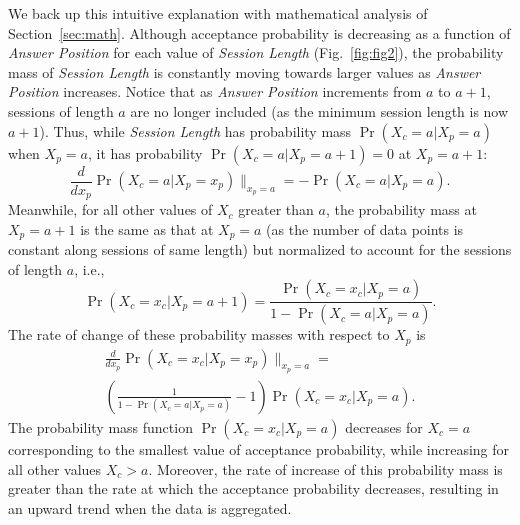 We back up this intuitive explanation with mathematical analysis of Section~\ref{sec:math}.
Although acceptance probability is decreasing as a function of \emph{Answer Position} for each value of \emph{Session Length} (Fig.~\ref{fig:fig2}), the probability mass of \emph{Session Length} is constantly moving towards larger values as \emph{Answer Position} increases. Notice that as \emph{Answer Position} increments from $a$ to $a+1$, sessions of length $a$ are no longer included (as the minimum session length is now $a+1$). Thus, while \emph{Session Length} has probability mass $\Pr(X_c=a|X_p=a)$ when $X_p=a$, it has probability $\Pr(X_c=a|X_p=a+1) = 0$ at $X_p=a+1$:
\begin{equation}
  \frac{d}{dx_p}\Pr(X_c=a|X_p=x_p)\|_{x_p=a} = -\Pr(X_c=a|X_p=a).
\end{equation}
Meanwhile, for all other values of $X_c$ greater than $a$, the probability mass at $X_p=a+1$ is the same as that at $X_p=a$ (as the number of data points is constant along sessions of same length) but normalized to account for the sessions of length $a$, i.e.,
\begin{equation}
 \Pr(X_c=x_c|X_p=a+1) = \frac{\Pr(X_c=x_c|X_p=a)}{1-\Pr(X_c=a|X_p=a)}.
\end{equation}
The rate of change of these probability masses with respect to $X_p$ is
\begin{multline}
  \frac{d}{dx_p}\Pr(X_c=x_c|X_p=x_p)\|_{x_p=a}  =   \\ \left(\frac{1}{1-\Pr(X_c=a|X_p=a)}-1\right)\Pr(X_c=x_c|X_p=a).
\end{multline}
The probability mass function $\Pr(X_c=x_c|X_p=a)$ decreases for $X_c=a$ corresponding to the smallest value of acceptance probability, while increasing for all other values $X_c > a$. Moreover, the rate of increase of this probability mass is greater than the rate at which the acceptance probability decreases, resulting in an upward trend when the data is aggregated.


%

